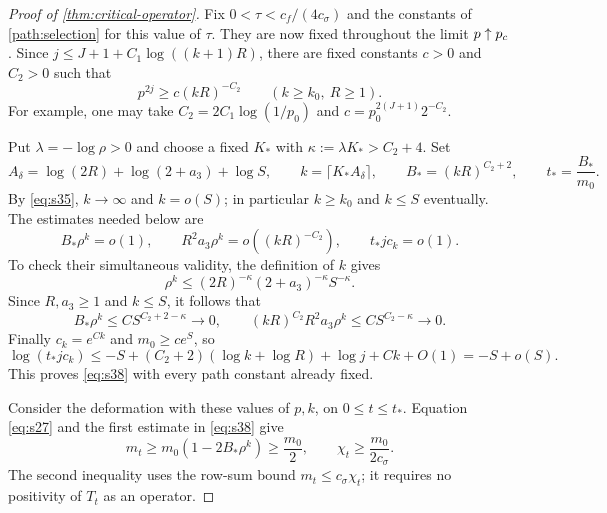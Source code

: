 \begin{proof}[Proof of \cref{thm:critical-operator}]
Fix $0<\tau<c_f/(4c_\sigma)$ and the constants of
\cref{path:selection} for this value of $\tau$. They are now fixed
throughout the limit $p\uparrow{p_c}$. Since
$j\le J+1+C_1\log((k+1)R)$, there are fixed constants $c>0$ and
$C_2>0$ such that
\begin{equation}
 p^{2j}\ge c(kR)^{-C_2}\qquad(k\ge k_0,\ R\ge1).
 \label{eq:s37}
\end{equation}
For example, one may take
$C_2=2C_1\log(1/p_0)$ and
$c=p_0^{2(J+1)}2^{-C_2}$.

Put $\lambda=-\log\rho>0$ and choose a fixed $K_*$ with
$\kappa:=\lambda K_*>C_2+4$. Set
\[
 A_\delta=\log(2R)+\log(2+a_3)+\log S,\qquad
 k=\lceil K_*A_\delta\rceil,\qquad
 B_*=(kR)^{C_2+2},\qquad t_*=\frac{B_*}{m_0}.
\]
By \eqref{eq:s35}, $k\to\infty$ and $k=o(S)$; in particular
$k\ge k_0$ and $k\le S$ eventually. The estimates needed below are
\begin{equation}
 B_*\rho^k=o(1),\qquad
 R^2a_3\rho^k=o((kR)^{-C_2}),\qquad
 t_*jc_k=o(1).
 \label{eq:s38}
\end{equation}
To check their simultaneous validity, the definition of $k$ gives
\[
 \rho^k\le (2R)^{-\kappa}(2+a_3)^{-\kappa}S^{-\kappa}.
\]
Since $R,a_3\ge1$ and $k\le S$, it follows that
\[
 B_*\rho^k\le C S^{C_2+2-\kappa}\longrightarrow0,
 \qquad
 (kR)^{C_2}R^2a_3\rho^k
 \le C S^{C_2-\kappa}\longrightarrow0.
\]
Finally $c_k=e^{Ck}$ and $m_0\ge c e^S$, so
\[
 \log(t_*jc_k)
 \le -S+(C_2+2)(\log k+\log R)+\log j+Ck+O(1)
 =-S+o(S).
\]
This proves \eqref{eq:s38} with every path constant already fixed.

Consider the deformation with these values of $p,k$, on
$0\le t\le t_*$. Equation \eqref{eq:s27} and the first estimate in
\eqref{eq:s38} give
\begin{equation}
 m_t\ge m_0(1-2B_*\rho^k)\ge\frac{m_0}{2},\qquad
 \chi_t\ge\frac{m_0}{2c_\sigma}.
 \label{con:retained-norm}
\end{equation}
The second inequality uses the row-sum bound $m_t\le c_\sigma\chi_t$;
it requires no positivity of $T_t$ as an operator.


\end{proof}
